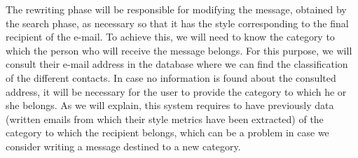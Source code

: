 The rewriting phase will be responsible for modifying the message, obtained by the search phase, as necessary so that it has the style corresponding to the final recipient of the e-mail. To achieve this, we will need to know the category to which the person who will receive the message belongs. For this purpose, we will consult their e-mail address in the database where we can find the classification of the different contacts. In case no information is found about the consulted address, it will be necessary for the user to provide the category to which he or she belongs. As we will explain, this system requires to have previously data (written emails from which their style metrics have been extracted) of the category to which the recipient belongs, which can be a problem in case we consider writing a message destined to a new category.
